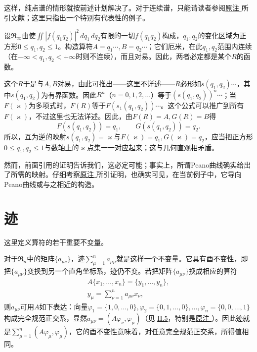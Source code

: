 \documentclass[fontsize=13pt,twoside,openany,headings=normal,parskip=false,bookmarkpackage=false,DIV=calc]{scrbook}
\begin{document}
这样，纯点谱的情形就按前述计划解决了。对于连续谱，只能请读者参阅\CJKglue \hyperlink{note-109}{原注 } 所引文献；这里只指出一个特别有代表性的例子。

设$\mathfrak R_\infty$由使$\iint|f(q_1q_2)|^2\,dq_1\,dq_2$有限的一切$f(q_1q_2)$构成，$q_1,\allowbreak q_2$的变化区域为正方形$0\leq q_1,\allowbreak q_2\leq1$。构造算符$A=q_1\cdots,\allowbreak B=q_2\cdots$；它们厄米，在此$q_1,\allowbreak q_2$范围内连续（在$-\infty<q_1,\allowbreak q_2<+\infty$时则不连续），而且对易。因此，两者必定都是某个$R$的函数。

\hypertarget{origpage-93}{}\label{origpage-93}这个$R$于是与$A,\allowbreak B$对易，由此可推出——这里不详述——$R$必形如$s(q_1,\allowbreak q_2)\cdots$，其中$s(q_1,\allowbreak q_2)$为有界函数。因此$R^n$（$n=0,\allowbreak 1,\allowbreak 2,\allowbreak \ldots$）等于$(s(q_1,\allowbreak q_2))^n\cdots$；当$F(\varkappa)$为多项式时，$F(R)$等于$F(s_1(q_1,\allowbreak q_2))\cdots$。这个公式可以推广到所有$F(\varkappa)$，不过这里也无法详述。因此，由$F(R)=A,\allowbreak G(R)=B$得
\[
F(s(q_1,q_2))=q_1,\qquad G(s(q_1,q_2))=q_2.
\]
所以，互为逆的映射$s(q_1,\allowbreak q_2)=\varkappa$与$F(\varkappa)=q_1,\allowbreak G(\varkappa)=q_2$，应当把正方形$0\leq q_1,\allowbreak q_2\leq1$与数轴上的$\varkappa$点集一一对应起来；这与几何直观相矛盾。

然而，前面引用的证明告诉我们，这必定可能；事实上，所谓Peano曲线确实给出了所需的映射。仔细考察\CJKglue \hyperlink{note-109}{原注 } 所引证明，也确实可见，在当前例子中，它导向Peano曲线或与之相近的构造。

\section{迹}\label{sec:II.11}
这里定义算符的若干重要不变量。

对于$\mathfrak R_n$中的矩阵$\{a_{\mu\nu}\}$，迹$\sum_{\mu=1}^na_{\mu\mu}$就是这样一个不变量。它具有酉不变性，即把$\{a_{\mu\nu}\}$变换到另一个直角坐标系，迹仍不变。若把矩阵$\{a_{\mu\nu}\}$换成相应的算符
\begin{gather*}
A\{x_1,\ldots,x_n\}=\{y_1,\ldots,y_n\},\\
y_\mu=\sum_{\nu=1}^n a_{\mu\nu}x_\nu,
\end{gather*}
则$a_{\mu\nu}$可用$A$如下表达：向量$\varphi_1=\{1,\allowbreak 0,\allowbreak \ldots,\allowbreak 0\},\allowbreak \varphi_2=\{0,\allowbreak 1,\allowbreak \ldots,\allowbreak 0\},\allowbreak \ldots,\allowbreak \varphi_n=\{0,\allowbreak 0,\allowbreak \ldots,\allowbreak 1\}$构成完全规范正交系，显然$a_{\mu\nu}=(A\varphi_\nu,\allowbreak \varphi_\mu)$（见 \hyperref[sec:II.5]{II.5}，特别是\CJKglue \hyperlink{note-60}{原注 }）。因此迹就是$\sum_{\mu=1}^n(A\varphi_\mu,\allowbreak \varphi_\mu)$，它的酉不变性意味着，对任意完全规范正交系，所得值相同。
\end{document}
